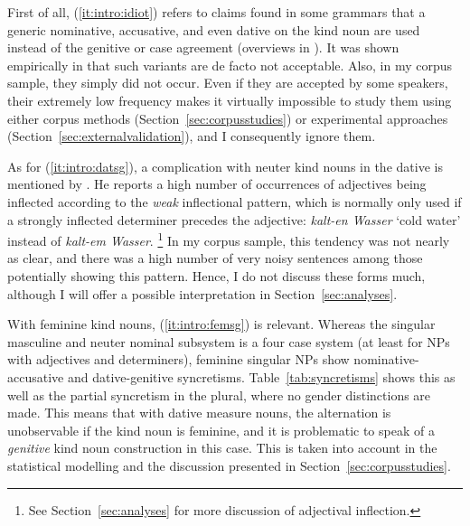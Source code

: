 \documentclass[USenglish]{article}
\begin{document}
\vspace{-1\baselineskip}

First of all, (\ref{it:intro:idiot}) refers to claims found in some grammars that a generic nominative, accusative, and even dative on the kind noun are used instead of the genitive or case agreement (overviews in \citealp{Hentschel1993,Zimmer2015}).
It was shown empirically in \cite{Hentschel1993} that such variants are de facto not acceptable.
Also, in my corpus sample, they simply did not occur.
Even if they are accepted by some speakers, their extremely low frequency makes it virtually impossible to study them using either corpus methods (Section~\ref{sec:corpusstudies}) or experimental approaches (Section~\ref{sec:externalvalidation}), and I consequently ignore them.

As for (\ref{it:intro:datsg}), a complication with neuter kind nouns in the dative is mentioned by \citet[20--22]{Zimmer2015}.
He reports a high number of occurrences of adjectives being inflected according to the \textit{weak} inflectional pattern, which is normally only used if a strongly inflected determiner precedes the adjective: \textit{kalt-en Wasser} `cold water' instead of \textit{kalt-em Wasser}.%
\footnote{See Section~\ref{sec:analyses} for more discussion of adjectival inflection.}
In my corpus sample, this tendency was not nearly as clear, and there was a high number of very noisy sentences among those potentially showing this pattern.
Hence, I do not discuss these forms much, although I will offer a possible interpretation in Section~\ref{sec:analyses}.

\label{page:femininesyncretism}
With feminine kind nouns, (\ref{it:intro:femsg}) is relevant.
Whereas the singular masculine and neuter nominal subsystem is a four case system (at least for NPs with adjectives and determiners), feminine singular NPs show nominative-accusative and dative-genitive syncretisms.
Table~\ref{tab:syncretisms} shows this as well as the partial syncretism in the plural, where no gender distinctions are made.
This means that with dative measure nouns, the alternation is unobservable if the kind noun is feminine, and it is problematic to speak of a \textit{genitive} kind noun construction in this case.
This is taken into account in the statistical modelling and the discussion presented in Section~\ref{sec:corpusstudies}.
\end{document}
